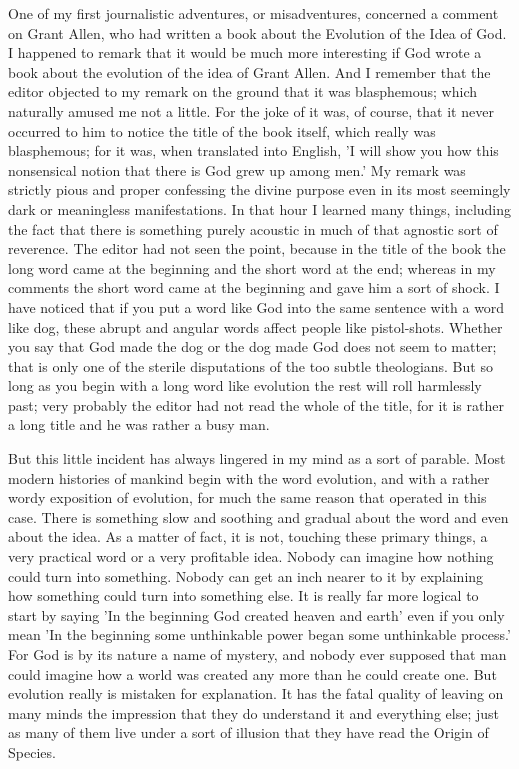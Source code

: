 One of my first journalistic adventures, or misadventures, concerned a comment on Grant Allen, who had written a book about the Evolution of the Idea of God. I happened to remark that it would be much more interesting if God wrote a book about the evolution of the idea of Grant Allen. And I remember that the editor objected to my remark on the ground that it was blasphemous; which naturally amused me not a little. For the joke of it was, of course, that it never occurred to him to notice the title of the book itself, which really was blasphemous; for it was, when translated into English, 'I will show you how this nonsensical notion that there is God grew up among men.' My remark was strictly pious and proper confessing the divine purpose even in its most seemingly dark or meaningless manifestations. In that hour I learned many things, including the fact that there is something purely acoustic in much of that agnostic sort of reverence. The editor had not seen the point, because in the title of the book the long word came at the beginning and the short word at the end; whereas in my comments the short word came at the beginning and gave him a sort of shock. I have noticed that if you put a word like God into the same sentence with a word like dog, these abrupt and angular words affect people like pistol-shots. Whether you say that God made the dog or the dog made God does not seem to matter; that is only one of the sterile disputations of the too subtle theologians. But so long as you begin with a long word like evolution the rest will roll harmlessly past; very probably the editor had not read the whole of the title, for it is rather a long title and he was rather a busy man.

But this little incident has always lingered in my mind as a sort of parable. Most modern histories of mankind begin with the word evolution, and with a rather wordy exposition of evolution, for much the same reason that operated in this case. There is something slow and soothing and gradual about the word and even about the idea. As a matter of fact, it is not, touching these primary things, a very practical word or a very profitable idea. Nobody can imagine how nothing could turn into something. Nobody can get an inch nearer to it by explaining how something could turn into something else. It is really far more logical to start by saying 'In the beginning God created heaven and earth' even if you only mean 'In the beginning some unthinkable power began some unthinkable process.' For God is by its nature a name of mystery, and nobody ever supposed that man could imagine how a world was created any more than he could create one. But evolution really is mistaken for explanation. It has the fatal quality of leaving on many minds the impression that they do understand it and everything else; just as many of them live under a sort of illusion that they have read the Origin of Species.

